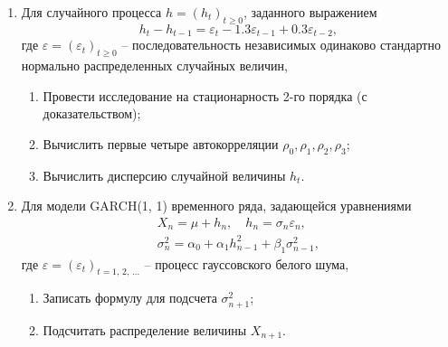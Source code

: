 \documentclass[a4paper,12pt]{extreport}
\renewcommand{\=}[1]{\stackrel{#1}{=}} %
\newcommand{\generaltime}{t \geqslant 0}
\newcommand{\discretetime}{t = 1,\,2,\,\ldots}
\newcommand{\newprocess}[1]{
	\ensuremath{
		#1 = \left(#1 _t\right)_{\generaltime}
	}
}
\newcommand{\newprocessd}[1]{
	\ensuremath{
		#1 = \left(#1 _t\right)_{\discretetime}
	}
}
\begin{document}
\begin{enumerate}
	\item Для случайного процесса $\newprocess{h}$, заданного выражением
	\[
	h_t - h_{t-1} = \varepsilon_t - 1.3 \varepsilon_{t-1} + 0.3 \varepsilon_{t-2},
	\]
	где $\newprocess{\varepsilon}$ -- последовательность независимых
	одинаково стандартно нормально распределенных случайных величин,
	\begin{enumerate}
	\item Провести исследование на стационарность 2-го порядка (с доказательством);
	\item Вычислить первые четыре автокорреляции $\rho_0, \rho_1, \rho_2, \rho_3$;
	\item Вычислить дисперсию случайной величины $h_t$.
	\end{enumerate}

	\item Для модели GARCH(1, 1) временного ряда, задающейся уравнениями
	\begin{align*}
	X_n = \mu + h_n, 
	\quad 
	h_n = \sigma_n \varepsilon_n, \\
	\sigma_n^2 = \alpha_0 + \alpha_1 h_{n-1}^2 + \beta_1 \sigma_{n-1}^2,
	\end{align*}
	где $\newprocessd{\varepsilon}$ -- процесс гауссовского белого шума,

	\begin{enumerate}
	\item Записать формулу для подсчета $\sigma^2_{n+1}$;
	\item Подсчитать распределение величины $X_{n+1}$.
	\end{enumerate}

\end{enumerate}
\end{document}
